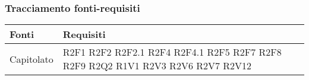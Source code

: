 \subsubsection{Tracciamento fonti-requisiti}
\begin{center}
	\centering
	\renewcommand{\arraystretch}{1.5}
	\begin{longtable}{  p{5cm} p{5cm} }
		\rowcolor{tableHeadYellow}
		\textbf{Fonti} & \textbf{Requisiti} \\
		\endhead  
		
		Capitolato & R2F1 \newline R2F2 \newline R2F2.1 \newline R2F4 \newline R2F4.1 \newline R2F5 \newline R2F7 \newline R2F8 \newline R2F9 \newline R2Q2 \newline R1V1 \newline R2V3 \newline R2V6 \newline R2V7 \newline R2V12 \\

\end{longtable}
\end{center}
